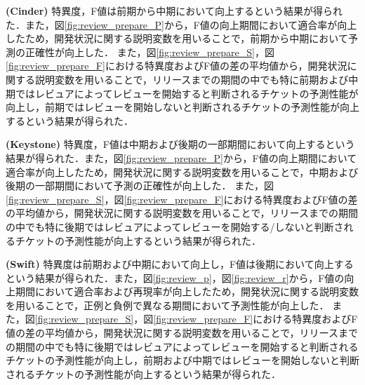 \documentclass[11pt]{jreport}
\begin{document}
\textbf{ (Cinder) }特異度，F値は前期から中期において向上するという結果が得られた．また，図\ref{fig:review_prepare_P}から，F値の向上期間において適合率が向上したため，開発状況に関する説明変数を用いることで，前期から中期において予測の正確性が向上した．
また，図\ref{fig:review_prepare_S}，図\ref{fig:review_prepare_F}における特異度およびF値の差の平均値から，開発状況に関する説明変数を用いることで，リリースまでの期間の中でも特に前期および中期ではレビュアによってレビューを開始すると判断されるチケットの予測性能が向上し，前期ではレビューを開始しないと判断されるチケットの予測性能が向上するという結果が得られた．

\textbf{ (Keystone) }特異度，F値は中期および後期の一部期間において向上するという結果が得られた．また，図\ref{fig:review_prepare_P}から，F値の向上期間において適合率が向上したため，開発状況に関する説明変数を用いることで，中期および後期の一部期間において予測の正確性が向上した．
また，図\ref{fig:review_prepare_S}，図\ref{fig:review_prepare_F}における特異度およびF値の差の平均値から，開発状況に関する説明変数を用いることで，リリースまでの期間の中でも特に後期ではレビュアによってレビューを開始する/しないと判断されるチケットの予測性能が向上するという結果が得られた．

\textbf{ (Swift) }特異度は前期および中期において向上し，F値は後期において向上するという結果が得られた．また，図\ref{fig:review_p}，図\ref{fig:review_r}から，F値の向上期間において適合率および再現率が向上したため，開発状況に関する説明変数を用いることで，正例と負例で異なる期間において予測性能が向上した．
また，図\ref{fig:review_prepare_S}，図\ref{fig:review_prepare_F}における特異度およびF値の差の平均値から，開発状況に関する説明変数を用いることで，リリースまでの期間の中でも特に後期ではレビュアによってレビューを開始すると判断されるチケットの予測性能が向上し，前期および中期ではレビューを開始しないと判断されるチケットの予測性能が向上するという結果が得られた．
\end{document}
